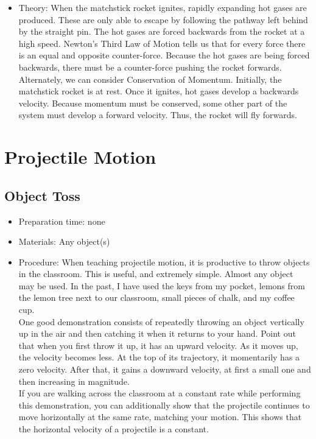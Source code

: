 \begin{itemize}
\item{Theory: When the matchstick rocket ignites, rapidly expanding hot gases are produced. These are only able to escape by following the pathway left behind by the straight pin. The hot gases are forced backwards from the rocket at a high speed. Newton’s Third Law of Motion tells us that for every force there is an equal and opposite counter-force. Because the hot gases are being forced backwards, there must be a counter-force pushing the rocket forwards.\\
Alternately, we can consider Conservation of Momentum. Initially, the matchstick rocket is at rest. Once it ignites, hot gases develop a backwards velocity. Because momentum must be conserved, some other part of the system must develop a forward velocity. Thus, the rocket will fly forwards.}
\end{itemize}

\section{Projectile Motion}

\subsection{Object Toss}
\begin{itemize}
\item{Preparation time: none}
\item{Materials: Any object(s)}
\item{Procedure: When teaching projectile motion, it is productive to throw objects in the classroom. This is useful, and extremely simple. Almost any object may be used. In the past, I have used the keys from my pocket, lemons from the lemon tree next to our classroom, small pieces of chalk, and my coffee cup.\\
One good demonstration consists of repeatedly throwing an object vertically up in the air and then catching it when it returns to your hand. Point out that when you first throw it up, it has an upward velocity. As it moves up, the velocity becomes less. At the top of its trajectory, it momentarily has a zero velocity. After that, it gains a downward velocity, at first a small one and then increasing in magnitude.\\
If you are walking across the classroom at a constant rate while performing this demonstration, you can additionally show that the projectile continues to move horizontally at the same rate, matching your motion. This shows that the horizontal velocity of a projectile is a constant.}
\end{itemize}

